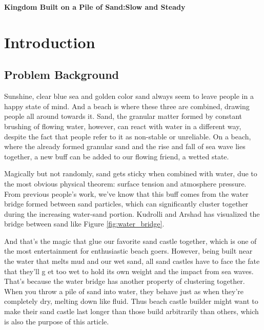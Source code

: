 \documentclass[12pt]{article}
\begin{document}
\clearpage
\pagestyle{fancy}


\begin{center}
    \Large \textbf{Kingdom Built on a Pile of Sand:Slow and Steady}
\end{center}

\newpage

\tableofcontents
\newpage
\setcounter{page}{1}

\section{Introduction}
\subsection{Problem Background}
Sunshine, clear blue sea and golden color sand always seem to leave people in a happy state of mind.
And a beach is where these three are combined, drawing people all around towards it. Sand, the granular matter formed by constant brushing of flowing water, however, can react with water in a different way, despite the fact that people refer to it as non-stable or unreliable. On a beach, where the already formed granular sand and the rise and fall of sea wave lies together, a new buff can be added to our flowing friend, a wetted state.
\par
Magically but not randomly, sand gets sticky when combined with water, due to the most obvious physical theorem: surface tension and atmosphere pressure. From previous people's work, we've know that this buff comes from the water bridge formed between sand particles, which can significantly cluster together during the increasing water-sand portion\autocite{pakpour2012construct,mitarai2006wet,kudrolli2008sticky}. Kudrolli and Arshad has visualized the bridge between sand like Figure \ref{fig:water_bridge}.
\par
And that's the magic that glue our favorite sand castle together, which is one of the most entertainment for enthusiastic beach goers. However, being built near the water that melts mud and our wet sand, all sand castles have to face the fate that they'll g et too wet to hold its own weight and the impact from sea waves. That's because the water bridge has another property of clustering together\autocite{kudrolli2008sticky}. When you throw a pile of sand into water, they behave just as when they're completely dry, melting down like fluid. Thus beach castle builder might want to make their sand castle last longer than those build arbitrarily than others, which is also the purpose of this article. 
\end{document}

